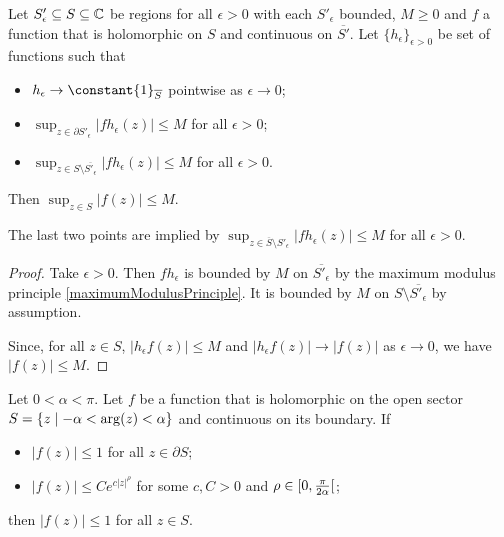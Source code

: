 \begin{proposition}
Let $S'_\epsilon\subseteq S\subseteq \mathbb{C}$ be regions for all $\epsilon > 0$ with each $S'_\epsilon$ bounded, $M\geq 0$ and $f$ a function that is holomorphic on $S$ and continuous on $\overline{S'}$. Let $\{h_\epsilon\}_{\epsilon > 0}$ be set of functions such that
\begin{itemize}
\item $h_\epsilon \to \constant{1}_{\overline{S}}$ pointwise as $\epsilon \to 0$;
\item $\sup_{z\in \partial S'_\epsilon}\big|fh_\epsilon(z)\big| \leq M$ for all $\epsilon > 0$;
\item $\sup_{z\in S\setminus \overline{S'_\epsilon}}\big|fh_\epsilon(z)\big| \leq M$  for all $\epsilon > 0$.
\end{itemize}
Then $\sup_{z\in S}\big|f(z)\big| \leq M$.
\end{proposition}
The last two points are implied by $\sup_{z\in \overline{S}\setminus S'_\epsilon}\big|fh_\epsilon(z)\big| \leq M$ for all $\epsilon > 0$.
\begin{proof}
Take $\epsilon >0$. Then $fh_\epsilon$ is bounded by $M$ on $\overline{S'_\epsilon}$ by the maximum modulus principle \ref{maximumModulusPrinciple}. It is bounded by $M$ on $S\setminus \overline{S'_\epsilon}$ by assumption.

Since, for all $z\in S$, $|h_\epsilon f(z)| \leq M$ and $|h_\epsilon f(z)| \to |f(z)|$ as $\epsilon \to 0$, we have $|f(z)|\leq M$.
\end{proof}
\begin{corollary}
Let $0< \alpha < \pi$. Let $f$ be a function that is holomorphic on the open sector $S = \setbuilder{z}{-\alpha < \arg(z) < \alpha}$ and continuous on its boundary. If
\begin{itemize}
\item $|f(z)|\leq 1$ for all $z\in \partial S$;
\item $|f(z)| \leq Ce^{c|z|^\rho}$ for some $c, C > 0$ and $\rho \in \interval[co]{0, \frac{\pi}{2\alpha}}$;
\end{itemize}
then $|f(z)| \leq 1$ for all $z\in S$.
\end{corollary}
